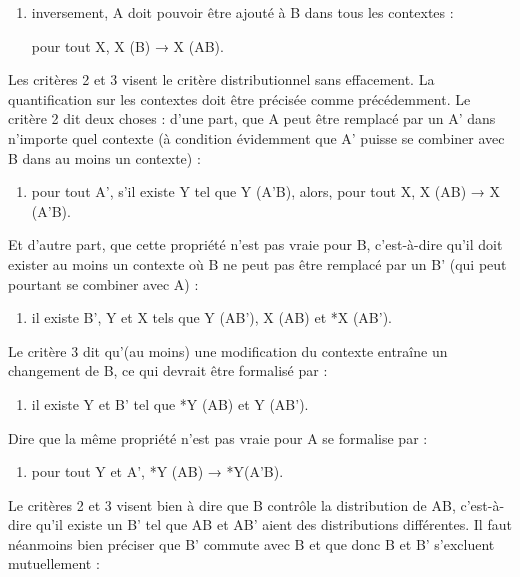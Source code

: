 {\begin{enumerate}[label=1\alph*.]
        \begin{center} pour tout X, X (AB) → X (B)\end{center}

    \item inversement, A doit pouvoir être ajouté à B dans tous les contextes :

        \begin{center}pour tout X, X (B) → X (AB).\end{center}
    \end{enumerate}
    Les critères 2 et 3 visent le critère distributionnel sans effacement. La quantification sur les contextes doit être précisée comme précédemment. Le critère 2 dit deux choses : d’une part, que A peut être remplacé par un A’ dans n’importe quel contexte (à condition évidemment que A’ puisse se combiner avec B dans au moins un contexte) :
    
    \begin{enumerate}[label=2a.] \item    pour tout A’, s’il existe Y tel que Y (A’B), alors, pour tout X, X (AB) → X (A’B).\end{enumerate}
    Et d’autre part, que cette propriété n’est pas vraie pour B, c’est-à-dire qu’il doit exister au moins un contexte où B ne peut pas être remplacé par un B’ (qui peut pourtant se combiner avec A) :
    
    \begin{enumerate}[label=2b.] \item  il existe B’, Y et X tels que Y (AB’), X (AB) et *X (AB’). \end{enumerate}
    Le critère 3 dit qu’(au moins) une modification du contexte entraîne un changement de B, ce qui devrait être formalisé par :
    
    \begin{enumerate}[label=3a.] \item il existe Y et B’ tel que *Y (AB) et Y (AB’).\end{enumerate}
    Dire que la même propriété n’est pas vraie pour A se formalise par :
    
    \begin{enumerate}[label=3b.] \item  pour tout Y et A’, *Y (AB) → *Y(A’B). \end{enumerate}
    Le critères 2 et 3 visent bien à dire que B contrôle la distribution de AB, c’est-à-dire qu’il existe un B’ tel que AB et AB’ aient des distributions différentes. Il faut néanmoins bien préciser que B’ commute avec B et que donc B et B’ s’excluent mutuellement :
    
}
